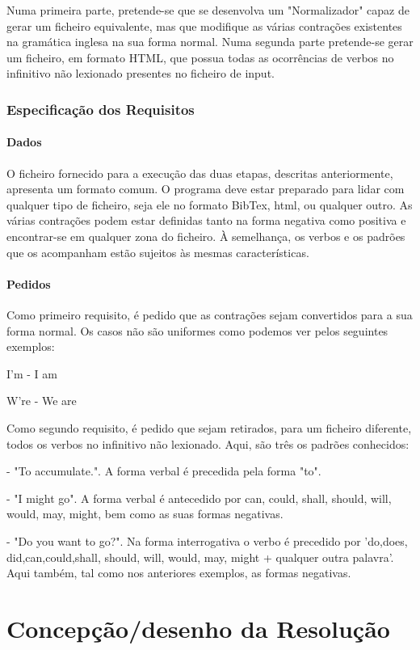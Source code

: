 \documentclass{report}
\begin{document}
Numa primeira parte, pretende-se que se desenvolva um "Normalizador" capaz 
de gerar um ficheiro equivalente, mas que modifique as várias contrações 
existentes na gramática inglesa na sua forma normal. Numa segunda parte 
pretende-se gerar um ficheiro, em formato HTML, que possua todas as 
ocorrências de verbos no infinitivo não lexionado presentes no ficheiro 
de input. 

\subsection{Especificação dos Requisitos}
\subsubsection{Dados}
O ficheiro fornecido para a execução das duas etapas, descritas anteriormente, 
apresenta um formato comum. O programa deve estar preparado para lidar com 
qualquer tipo de ficheiro, seja ele no formato BibTex, html, ou qualquer outro. 
As várias contrações podem estar definidas tanto na forma negativa como positiva e 
encontrar-se em qualquer zona do ficheiro. À semelhança, os verbos e os padrões 
que os acompanham estão sujeitos às mesmas características.

\subsubsection{Pedidos}
Como primeiro requisito, é pedido que as contrações sejam convertidos para a 
sua forma normal. Os casos não são uniformes como podemos ver pelos seguintes exemplos:\par
I'm - I am\par
W're - We are\par
Como segundo requisito, é pedido que sejam retirados, para um ficheiro diferente, 
todos os verbos no infinitivo não lexionado. Aqui, são três os padrões conhecidos:\par
- "To accumulate.". A forma verbal é precedida pela forma "to".\par
- "I might go". A forma verbal é antecedido por can, could, shall, should, will, 
would, may, might, 
bem como as suas formas negativas.\par
- "Do you want to go?". Na forma interrogativa o verbo é precedido por 'do,does,
did,can,could,shall, should, will, would, may, might + qualquer outra palavra'. 
Aqui também, tal como nos anteriores exemplos, as formas negativas.


\chapter{Concepção/desenho da Resolução} \label{cd}
\end{document}
